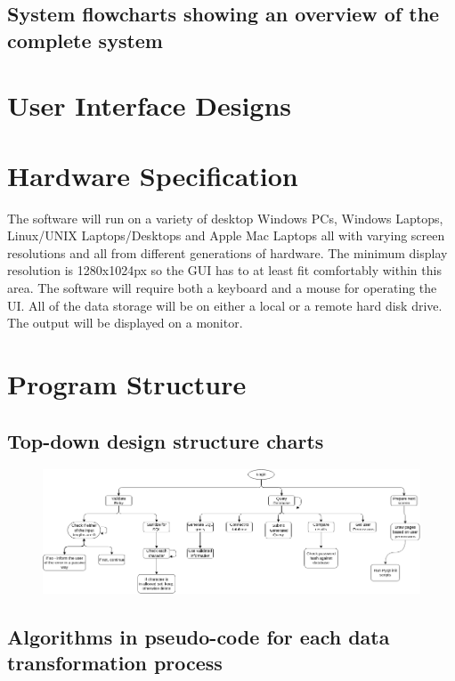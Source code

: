\subsection{System flowcharts showing an overview of the complete system}

\section{User Interface Designs}
	

\section{Hardware Specification}
	The software will run on a variety of desktop Windows PCs, Windows Laptops, Linux/UNIX Laptops/Desktops and Apple Mac Laptops all with varying screen resolutions and all from different generations of hardware. The minimum display resolution is 1280x1024px so the GUI has to at least fit comfortably within this area. The software will require both a keyboard and a mouse for operating the UI. All of the data storage will be on either a local or a remote hard disk drive. The output will be displayed on a monitor.


\section{Program Structure}

\subsection{Top-down design structure charts}

\begin{figure}
	\includegraphics[width=\textwidth]{./Design/tdsl.png}
\end{figure}

\subsection{Algorithms in pseudo-code for each data transformation process}

